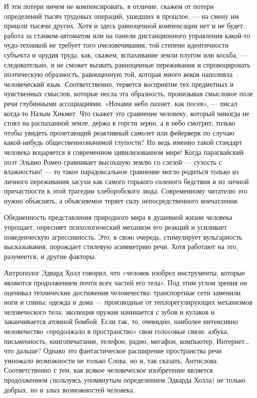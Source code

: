 И эти потери ничем не компенсировать, в отличие, скажем от потери определений
тысяч трудовых операций, ушедших в прошлое, — на смену им пришли тысячи других.
Хотя и здесь равноценной компенсации нет и не будет: работа за
станком-автоматом или на панели дистанционного управления какой-то
чудо-техникой не требует того очеловечивания, той степени идентичности субъекта
и орудия труда, как, скажем, вспахивание земли плугом или косьба, —
следовательно, и не сможет вызвать равноценные переживания и спровоцировать
поэтическую образность, равноценную той, которая много веков наполняла
человеческий язык. Соответственно, теряется восприятие тех предметных и
чувственных смыслов, которые несла эта образность, пронизывая смысловое поле
речи глубинными ассоциациями. «Ночами небо пахнет, как посев», — писал когда-то
Назым Хикмет. Что скажет это сравнение человеку, который никогда не стоял на
распаханной земле, держа в горсти зерно, а в небо смотрит, только чтобы увидеть
пролетающий реактивный самолет или фейерверк по случаю какой-нибудь
общественнозначимой глупости? Но ведь именно такой стандарт человека воцаряется
в современном цивилизованном мире! Когда парагвайский поэт Эльвио Ромео
сравнивает высохшую землю со слезой — сухость с влажностью! — то такое
парадоксальное сравнение могло родиться только из личного переживания засухи
как самого горького соленого бедствия и из личной причастности к этой трагедии
хлеборобского люда. Современному читателю это нужно объяснять, а объясняемое
теряет силу непосредственного впечатления.

Обедненность представления природного мира в душевной жизни человека упрощает,
опресняет психологический механизм его реакций и усиливает поведенческую
агрессивность. Это, в свою очередь, стимулирует вульгарность высказывания,
порождает стилевую асимметрию речи. Хотя работают на это, разумеется, и другие
факторы.

Антрополог Эдвард Холл говорил, что «человек изобрел инструменты, которые
являются продолжением почти всех частей его тела». Под этим углом зрения он
оценивал технические достижения человечества: транспортные сети заменили ноги и
спины; одежда и дома — производные от теплорегулирующих механизмов
человеческого тела; эволюция оружия начинается с зубов и кулаков и
заканчивается атомной бомбой. Если так, то, очевидно, наиболее интенсивно
человечество «продолжало в пространство» свои голосовые связи: азбука,
письменность, книгопечатание, телефон, радио, мегафон, компьютер, Интернет… что
дальше? Однако это фантастическое расширение пространства речи умножало
возможности не только Слова, но и, так сказать, Антислова. Соответственно с
тем, как всякое человеческое изобретение является продолжением (пользуясь
упомянутым определением Эдварда Холла) не только добрых, но и злых возможностей
человека.


